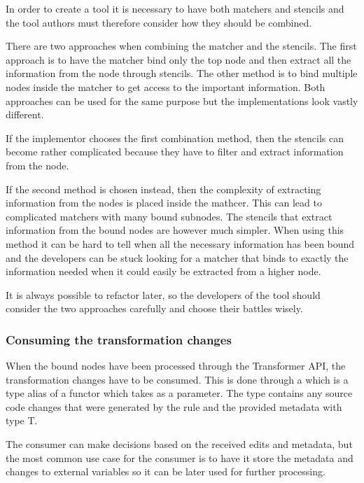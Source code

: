 In order to create a tool it is necessary to have both matchers and stencils and the tool authors must therefore consider how they should be combined.

There are two approaches when combining the matcher and the stencils. The first approach is to have the matcher bind only the top node and then extract all the information from the node through stencils. The other method is to bind multiple nodes inside the matcher to get access to the important information. Both approaches can be used for the same purpose but the implementations look vastly different.
 
If the implementor chooses the first combination method, then the stencils can become rather complicated because they have to filter and extract information from the node. 

If the second method is chosen instead, then the complexity of extracting information from the nodes is placed inside the mathcer. This can lead to complicated matchers with many bound subnodes. The stencils that extract information from the bound nodes are however much simpler. When using this method it can be hard to tell when all the necessary information has been bound and the developers can be stuck looking for a matcher that binds to exactly the information needed when it could easily be extracted from a higher node.

It is always possible to refactor later, so the developers of the tool should consider the two approaches carefully and choose their battles wisely.

\subsubsection*{Consuming the transformation changes} \label{subsubsec:080dev:Consumers}

When the bound nodes have been processed through the Transformer API, the transformation changes have to be consumed. This is done through a  which is a type alias of a functor which takes  as a parameter. The  type contains any source code changes that were generated by the rule and the provided metadata with type T.

The consumer can make decisions based on the received edits and metadata, but the most common use case for the consumer is to have it store the metadata and changes to external variables so it can be later used for further processing.

